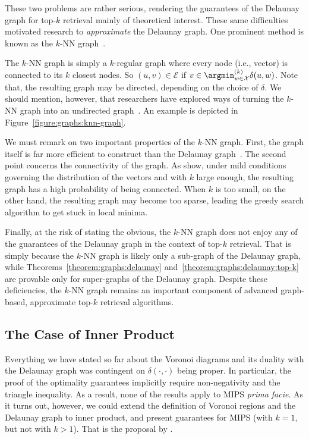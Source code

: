 \bigskip

These two problems are rather serious, rendering the guarantees of the Delaunay graph for
top-$k$ retrieval mainly of theoretical interest. These same difficulties motivated
research to \emph{approximate} the Delaunay graph. One prominent method is known
as the $k$-NN graph~\citep{chavez2010knn,hajebi2011fast,fu2016efanna}.

The $k$-NN graph is simply a $k$-regular graph where every node (i.e., vector) is
connected to its $k$ closest nodes. So $(u, v) \in \mathcal{E}$ if $v \in \argmin^{(k)}_{w \in \mathcal{X}} \delta(u, w)$. Note that, the resulting graph may be directed, depending on the choice of $\delta$.
We should mention, however, that researchers have explored ways of turning the $k$-NN graph
into an undirected graph~\citep{chavez2010knn}. An example is depicted in
Figure~\ref{figure:graphs:knn-graph}.

We must remark on two important properties of the $k$-NN graph.
First, the graph itself is far more efficient to construct than the Delaunay
graph~\citep{chen2009fast-knngraph-construction,vaidya1989knn-construction,connor2010fast-knngraph,dong2011knn-graph}.
The second point concerns the connectivity of the graph.
As \cite{Brito1997knn-graph} show, under mild conditions governing the distribution of the vectors
and with $k$ large enough, the resulting graph has a high probability of being connected.
When $k$ is too small, on the other hand, the resulting graph may become too sparse,
leading the greedy search algorithm to get stuck in local minima.

Finally, at the risk of stating the obvious, the $k$-NN graph does not enjoy any of
the guarantees of the Delaunay graph in the context of top-$k$ retrieval.
That is simply because the $k$-NN graph is likely only a sub-graph of the Delaunay graph,
while Theorems~\ref{theorem:graphs:delaunay} and~\ref{theorem:graphs:delaunay:top-k}
are provable only for super-graphs of the Delaunay graph.
Despite these deficiencies, the $k$-NN graph remains an important component
of advanced graph-based, approximate top-$k$ retrieval algorithms.

\subsection{The Case of Inner Product}
Everything we have stated so far about the Voronoi diagrams and its duality with
the Delaunay graph was contingent on $\delta(\cdot, \cdot)$ being proper.
In particular, the proof of the optimality guarantees implicitly require non-negativity
and the triangle inequality. As a result, none of the results apply to MIPS \emph{prima facie}.
As it turns out, however, we could extend the definition of Voronoi regions and the Delaunay graph
to inner product, and present guarantees for MIPS (with $k=1$, but not with $k>1$).
That is the proposal by \cite{morozov2018ip-nsw}.

